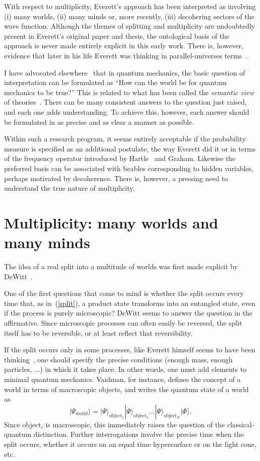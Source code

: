 \documentclass[12pt]{article}
\begin{document}
With respect to multiplicity, Everett's approach
has been interpreted as involving (i) many worlds,
(ii) many minds or, more recently, (iii) decohering
sectors of the wave function.  Although the themes
of splitting and multiplicity are undoubtedly
present in Everett's original paper and thesis,
the ontological basis of the approach is never made
entirely explicit in this early work.
There is, however, evidence
that later in his life Everett was thinking in
parallel-universes terms~\cite{deutsch1}.

I have advocated elsewhere~\cite{marchildon1} that
in quantum mechanics, the basic question of
interpretation can be formulated as ``How can the
world be for quantum mechanics to be true?'' This
is related to what has been called the \emph{semantic
view} of theories~\cite{fraassen}.  There can be many
consistent answers to the question just raised, and
each one adds understanding.  To achieve this,
however, each answer should be formulated
in as precise and as clear a manner as possible.

Within such a research program, it seems entirely
acceptable if the probability measure is specified as
an additional postulate, the way Everett did it or
in terms of the frequency operator introduced
by Hartle~\cite{hartle} and Graham.  Likewise
the preferred basis can be associated with
beables corresponding to hidden variables,
perhaps motivated by decoherence.  There is,
however, a pressing need to understand the
true nature of multiplicity.
%
\section{Multiplicity: many worlds and many minds}
\label{sec3}
%
The idea of a real split into
a multitude of worlds was first made explicit
by DeWitt~\cite{dewitt}.

One of the first questions that come to mind is
whether the split occurs every time that, as
in~(\ref{split}), a product state transforms into
an entangled state, even if the process is
purely microscopic?  DeWitt seems to answer the
question in the affirmative.  Since microscopic
processes can often easily be reversed, the split
itself has to be reversible, or at least reflect that
reversibility.

If the split occurs only in some processes, like
Everett himself seems to have been
thinking~\cite{everett1}, one should specify the
precise conditions (enough mass, enough
particles, $\ldots$)
in which it takes place.  In other words,
one must add elements to minimal quantum mechanics.
Vaidman, for instance, defines the concept of a world
in terms of macroscopic objects, and writes the quantum
state of a world as~\cite{vaidman}
%
\begin{equation}
|\Psi_{\text{world}} \rangle
= |\Psi\rangle_{\text{object}_1}
|\Psi\rangle_{\text{object}_2} \ldots
|\Psi\rangle_{\text{object}_N} |\Phi \rangle .
\end{equation}
%
Since object$_i$ is macroscopic, this immediately
raises the question of the classical-quantum distinction.
Further interrogations involve the precise time when
the split occurs, whether it occurs on an equal time
hypersurface or on the light cone, etc.
\end{document}
